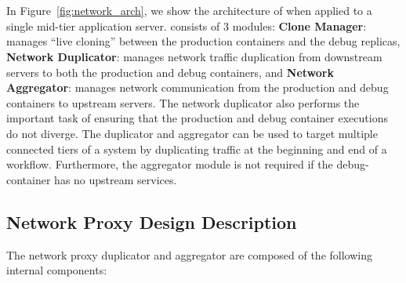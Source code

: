 




\section{\parikshan}
\label{sec:designParikshan}

In Figure~\ref{fig:network_arch}, we show the architecture of \parikshan when applied to a single mid-tier application server.
\parikshan consists of 3 modules: 
\textbf{Clone Manager}: manages ``live cloning'' between the production containers and the debug replicas, 
\textbf{Network Duplicator}: manages network traffic duplication from downstream servers to both the production and debug containers, 
and \textbf{Network Aggregator}: manages network communication from the production and debug containers to upstream servers.
The network duplicator also performs the important task of ensuring that the production and debug container executions do not diverge.
The duplicator and aggregator can be used to target multiple connected tiers of a system by duplicating traffic at the beginning and end of a workflow.
Furthermore, the aggregator module is not required if the debug-container has no upstream services. 




\subsection{Network Proxy Design Description}

The network proxy duplicator and aggregator are composed of the following internal components:

